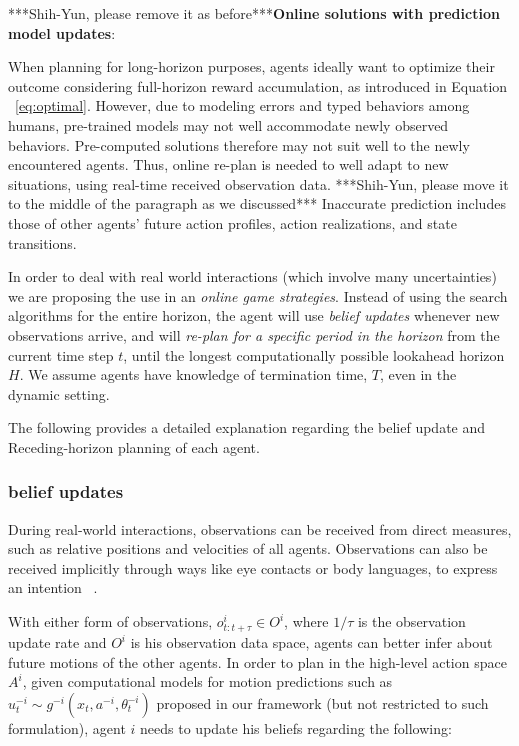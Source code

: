 \documentclass[letterpaper, 10 pt, conference]{ieeeconf}  %
\begin{document}
***Shih-Yun, please remove it as before***\textbf{Online solutions with prediction model updates}:

When planning for long-horizon purposes, agents ideally want to optimize their 
outcome considering full-horizon reward accumulation, as introduced in Equation 
~\ref{eq:optimal}. However, due to modeling errors and typed behaviors among 
humans, pre-trained models may not well accommodate newly observed behaviors. 
Pre-computed solutions therefore may not suit well to the newly 
encountered agents. Thus, online re-plan is needed to well adapt to new 
situations, using real-time received observation data. 
***Shih-Yun, please move it to the middle of the paragraph as we discussed*** Inaccurate prediction includes those of other agents' future action profiles, action realizations, and state transitions. 

In order to deal with real world interactions (which involve many uncertainties) we are proposing the use in an \textit{online game 
strategies}. Instead of using the search algorithms for the entire 
horizon, the agent will use \textit{belief updates} whenever new 
observations arrive, and will \textit{re-plan for a specific period in the horizon} from the current time step $t$, until the longest computationally possible lookahead horizon $H$. We assume agents have knowledge of termination time, $T$, even in the dynamic setting.

The following provides a detailed explanation regarding the belief update and 
Receding-horizon planning of each agent.
 
\subsubsection{belief updates}\label{sec:belief_update}
During real-world interactions, observations can be received from direct measures, such as relative positions and velocities of all agents. Observations can also be received implicitly through ways like eye contacts or body languages, to express an intention ~\cite{knepper2017implicit}.

With either form of observations, $o^i_{t:t+\tau} \in O^i$, where $1/\tau$ is the 
observation  
update rate and $O^i$ is his observation data space, agents can better infer about 
future motions of the other agents. In order to plan in the high-level action space $A^i$, given computational models for motion 
predictions such as $u^{-i}_t \sim g^{-i}(x_t,a^{-i},\theta^{-i}_t)$ proposed in our framework (but not restricted to such formulation), agent $i$ needs to update his beliefs regarding the following:
\end{document}

